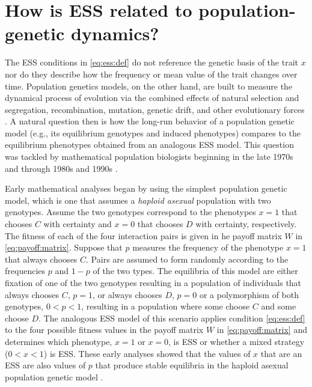 \documentclass[11pt]{article}
\begin{document}
\section{How is ESS related to population-genetic dynamics?}

The ESS conditions in \eqref{eq:ess:def} do not reference the genetic basis of the trait $x$ nor do they describe how the frequency or mean value of the trait changes over time. Population genetics models, on the other hand, are built to measure the dynamical process of evolution via the combined effects of natural selection and segregation, recombination, mutation, genetic drift, and other evolutionary forces \cite{Crow:Kimura:1970,Ewens:2004}. A natural question then is how the long-run behavior of a population genetic model (e.g., its equilibrium genotypes and induced phenotypes) compares to the equilibrium phenotypes obtained from an analogous ESS model. This question was tackled by mathematical population biologists beginning in the late 1970s and through 1980s and 1990s \cite[e..g,][]{Taylor:Jonker:1978,Hofbauer:Schuster:1979,Zeeman:1980,Eshel:1982,Hofbauer:Schuster:1982,Cressman:Hines:1984,Eshel:Feldman:1984,Lessard:1984,Cressman:1988,Cressman:Hofbauer:1996,Eshel:1996,Hammerstein:1996,Weissing:1996}.

Early mathematical analyses began by using the simplest population genetic model, which is one that assumes a \textit{haploid asexual} population with two genotypes. Assume the two genotypes correspond to the phenotypes $x=1$ that chooses $C$ with certainty and $x=0$ that chooses $D$ with certainty, respectively. The fitness of each of the four interaction pairs is given in he payoff matrix $W$ in \eqref{eq:payoff:matrix}. Suppose that $p$ measures the frequency of the phenotype $x=1$ that always chooses $C$. Pairs are assumed to form randomly according to the frequencies $p$ and $1-p$ of the two types. The equilibria of this model are either fixation of one of the two genotypes resulting in a population of individuals that always chooses $C$, $p=1$, or always chooses $D$, $p=0$ or a polymorphism of both genotypes, $0 < p < 1$, resulting in a population where some choose $C$ and some choose $D$. The analogous ESS model of this scenario applies condition \eqref{eq:ess:def} to the four possible fitness values in the payoff matrix $W$ in \eqref{eq:payoff:matrix} and determines which phenotype, $x=1$ or $x=0$, is ESS or whether a mixed strategy ($0 < x < 1$) is ESS. These early analyses showed that the values of $x$ that are an ESS are also values of $p$ that produce stable equilibria in the haploid asexual population genetic model \cite{Taylor:Jonker:1978,Hofbauer:Schuster:1979,Zeeman:1980,Hofbauer:Sigmund:1998}.
\end{document}
